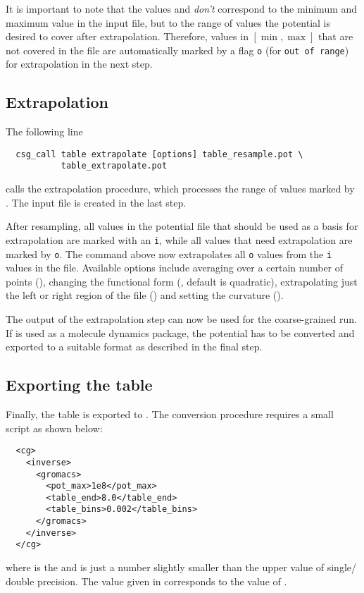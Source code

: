 It is important to note that the values  and  \textit{don't} correspond to the minimum and maximum value in the input file, but to the range of values the potential is desired to cover after extrapolation. Therefore, values in $[ \min,\max ]$ that are not covered in the file are automatically marked by a flag \texttt{o} (for \texttt{out of range}) for extrapolation in the next step.

\subsection*{Extrapolation}
The following line
\begin{verbatim}
  csg_call table extrapolate [options] table_resample.pot \
           table_extrapolate.pot
\end{verbatim}
calls the extrapolation procedure, which processes the range of values marked by . The input file is  created in the last step.

After resampling, all values in the potential file that should be used as a basis for extrapolation are marked with an \texttt{i}, while all values that need extrapolation are marked by \texttt{o}. The command above now extrapolates all \texttt{o} values from the \texttt{i} values in the file. Available options include averaging over a certain number of points (), changing the functional form (, default is quadratic), extrapolating just the left or right region of the file () and setting the curvature ().

The output  of the extrapolation step can now be used for the coarse-grained run. If \gromacs is used as a molecule dynamics package, the potential has to be converted and exported to a suitable \gromacs format as described in the final step.

\subsection*{Exporting the table}
Finally, the table is exported to . The conversion procedure requires a small script  as shown below:
\begin{verbatim}
  <cg>
    <inverse>
      <gromacs>
        <pot_max>1e8</pot_max>
        <table_end>8.0</table_end>
        <table_bins>0.002</table_bins>
      </gromacs>
    </inverse>
  </cg>
\end{verbatim}
where  is the \gromacs {} and  is just a number slightly smaller than the upper value of single/ double precision. The value given in  corresponds to the  value of .

